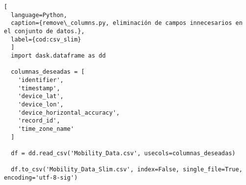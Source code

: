 \begin{lstlisting}[
  language=Python,
  caption={remove\_columns.py, eliminación de campos innecesarios en el conjunto de datos.},
  label={cod:csv_slim}
  ]
  import dask.dataframe as dd

  columnas_deseadas = [
    'identifier',
    'timestamp',
    'device_lat',
    'device_lon',
    'device_horizontal_accuracy',
    'record_id',
    'time_zone_name'
  ]

  df = dd.read_csv('Mobility_Data.csv', usecols=columnas_deseadas)

  df.to_csv('Mobility_Data_Slim.csv', index=False, single_file=True, encoding='utf-8-sig')
\end{lstlisting}
\vfill
